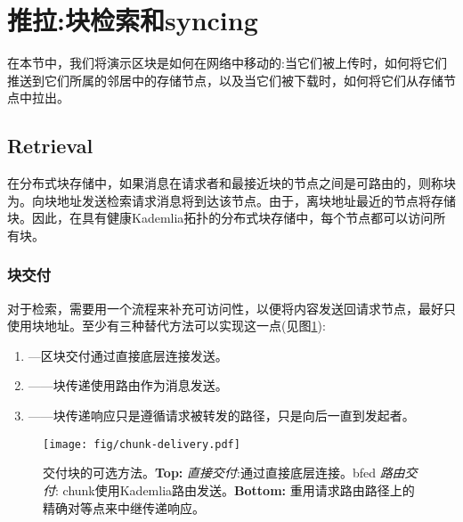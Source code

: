 \section{推拉:块检索和syncing\statusgreen}\label{sec:push-and-pull}
\green{}
在本节中，我们将演示区块是如何在网络中移动的:当它们被上传时，如何将它们推送到它们所属的邻居中的存储节点，以及当它们被下载时，如何将它们从存储节点中拉出。

\subsection{Retrieval\statusgreen}\label{sec:retrieval}

在分布式块存储中，如果消息在请求者和最接近块的节点之间是可路由的，则称块为。向块地址发送检索请求消息将到达该节点。由于，离块地址最近的节点将存储块。因此，在具有健康Kademlia拓扑的分布式块存储中，每个节点都可以访问所有块。

\subsubsection{块交付}

对于检索，需要用一个流程来补充可访问性，以便将内容发送回请求节点，最好只使用块地址。至少有三种替代方法可以实现这一点(见图\ref{fig:chunk-delivery}):

\begin{enumerate}
    \item {}—区块交付通过直接底层连接发送。 
    \item {}——块传递使用路由作为消息发送。
    \item {}——块传递响应只是遵循请求被转发的路径，只是向后一直到发起者。
\end{enumerate}


\begin{figure}[htbp]
   \centering
   \texttt{[image: fig/chunk-delivery.pdf]}
   \caption[交付块的可选方法:直接、路由和向后\statusgreen]{交付块的可选方法。\textbf{Top:} \emph{直接交付}:通过直接底层连接。bfed \emph{路由交付}: chunk使用Kademlia路由发送。\textbf{Bottom:} 重用请求路由路径上的精确对等点来中继传递响应。}
   \label{fig:chunk-delivery}
\end{figure}

